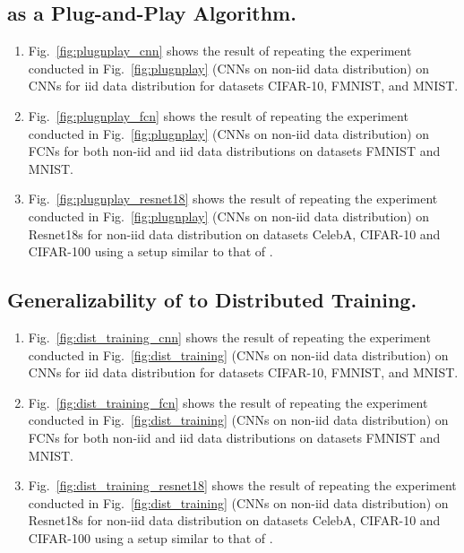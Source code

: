 \subsection{{\algName} as a Plug-and-Play Algorithm.}
\label{app:plugnplay_expt}
\begin{enumerate}[leftmargin=5mm]
    \item Fig.~\ref{fig:plugnplay_cnn} shows the result of repeating the experiment conducted in Fig.~\ref{fig:plugnplay} (CNNs on non-iid data distribution) on CNNs for iid data distribution for datasets CIFAR-10, FMNIST, and MNIST.
    \item Fig.~\ref{fig:plugnplay_fcn} shows the result of repeating the experiment conducted in Fig.~\ref{fig:plugnplay} (CNNs on non-iid data distribution) on FCNs for both non-iid and iid data distributions on datasets FMNIST and MNIST.
    \item Fig.~\ref{fig:plugnplay_resnet18} shows the result of repeating the experiment conducted in Fig.~\ref{fig:plugnplay} (CNNs on non-iid data distribution) on Resnet18s for non-iid data distribution on datasets CelebA, CIFAR-10 and CIFAR-100 using a setup similar to that of \cite{wang2018atomo}.
\end{enumerate}


\subsection{Generalizability of {\algName} to Distributed Training.}
\label{app:general_expt}
\begin{enumerate}[leftmargin=5mm]
    \item Fig.~\ref{fig:dist_training_cnn} shows the result of repeating the experiment conducted in Fig.~\ref{fig:dist_training} (CNNs on non-iid data distribution) on CNNs for iid data distribution for datasets CIFAR-10, FMNIST, and MNIST.
    \item Fig.~\ref{fig:dist_training_fcn} shows the result of repeating the experiment conducted in Fig.~\ref{fig:dist_training} (CNNs on non-iid data distribution) on FCNs for both non-iid and iid data distributions on datasets FMNIST and MNIST.
    \item Fig.~\ref{fig:dist_training_resnet18} shows the result of repeating the experiment conducted in Fig.~\ref{fig:dist_training} (CNNs on non-iid data distribution) on Resnet18s for non-iid data distribution on datasets CelebA, CIFAR-10 and CIFAR-100 using a setup similar to that of \cite{wang2018atomo}.
\end{enumerate}


